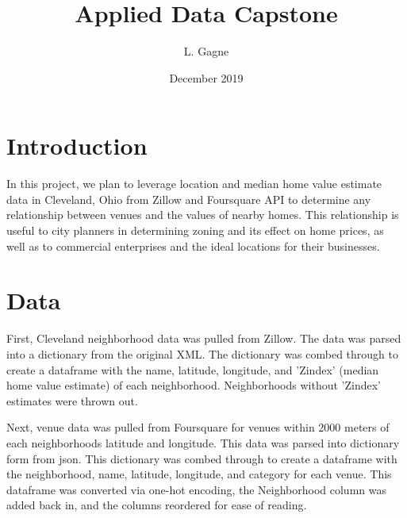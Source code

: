 \documentclass[twoside,14pt]{report}
\title{Applied Data Capstone}
\author{L. Gagne}
\date{December 2019}
\begin{document}
\maketitle

\chapter*{Introduction}


In this project, we plan to leverage location and median home value estimate data in Cleveland, Ohio from Zillow and Foursquare API to determine any relationship between venues and the values of nearby homes.  This relationship is useful to city planners in determining zoning and its effect on home prices, as well as to commercial enterprises and the ideal locations for their businesses.

\chapter*{Data}


First, Cleveland neighborhood data was pulled from Zillow.  The data was parsed into a dictionary from the original XML.  The dictionary was combed through to create a dataframe with the name, latitude, longitude, and 'Zindex' (median home value estimate) of each neighborhood.  Neighborhoods without 'Zindex' estimates were thrown out.

Next, venue data was pulled from Foursquare for venues within 2000 meters of each neighborhoods latitude and longitude.  This data was parsed into dictionary form from json.  This dictionary was combed through to create a dataframe with the neighborhood, name, latitude, longitude, and category for each venue.  This dataframe was converted via one-hot encoding, the Neighborhood column was added back in, and the columns reordered for ease of reading. 
\end{document}
